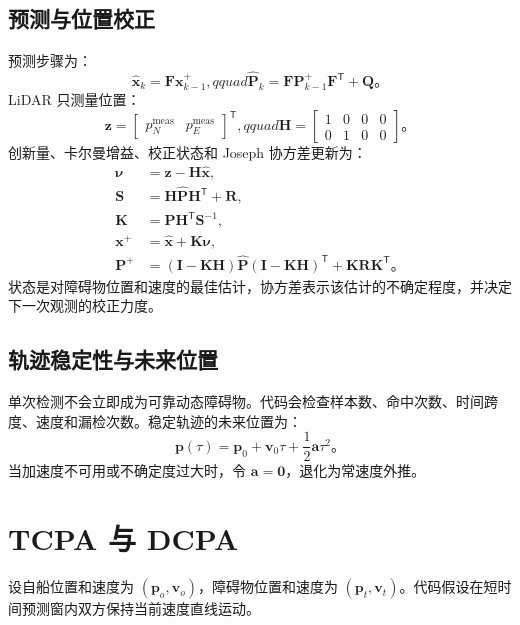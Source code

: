 \documentclass[UTF8,11pt,a4paper]{ctexart}
\begin{document}
\subsection{预测与位置校正}
预测步骤为：
\[
\hat{\bm{x}}_k=\bm{F}\bm{x}_{k-1}^{+},qquad
\hat{\bm{P}}_k=\bm{F}\bm{P}_{k-1}^{+}\bm{F}^{\mathsf T}+\bm{Q}。
\]
LiDAR 只测量位置：
\[
\bm{z}=\begin{bmatrix}p_N^{\mathrm{meas}}&p_E^{\mathrm{meas}}\end{bmatrix}^{\mathsf T},qquad
\bm{H}=\begin{bmatrix}1&0&0&0\\0&1&0&0\end{bmatrix}。
\]
创新量、卡尔曼增益、校正状态和 Joseph 协方差更新为：
\begin{align}
\bm{\nu}&=\bm{z}-\bm{H}\hat{\bm{x}},\\
\bm{S}&=\bm{H}\hat{\bm{P}}\bm{H}^{\mathsf T}+\bm{R},\\
\bm{K}&=\hat{\bm{P}}\bm{H}^{\mathsf T}\bm{S}^{-1},\\
\bm{x}^{+}&=\hat{\bm{x}}+\bm{K}\bm{\nu},\\
\bm{P}^{+}&=(\bm{I}-\bm{K}\bm{H})\hat{\bm{P}}(\bm{I}-\bm{K}\bm{H})^{\mathsf T}+\bm{K}\bm{R}\bm{K}^{\mathsf T}。
\end{align}
状态是对障碍物位置和速度的最佳估计，协方差表示该估计的不确定程度，并决定下一次观测的校正力度。



\subsection{轨迹稳定性与未来位置}
单次检测不会立即成为可靠动态障碍物。代码会检查样本数、命中次数、时间跨度、速度和漏检次数。稳定轨迹的未来位置为：
\[
\bm{p}(\tau)=\bm{p}_0+\bm{v}_0\tau+\frac12\bm{a}\tau^2。
\]
当加速度不可用或不确定度过大时，令 \(\bm{a}=\bm{0}\)，退化为常速度外推。




\section{TCPA 与 DCPA}

设自船位置和速度为 \((\bm{p}_o,\bm{v}_o)\)，障碍物位置和速度为 \((\bm{p}_t,\bm{v}_t)\)。代码假设在短时间预测窗内双方保持当前速度直线运动。
\end{document}
